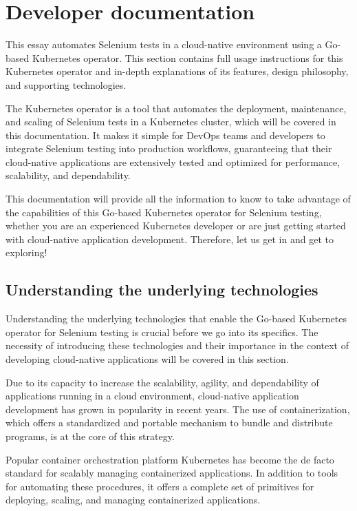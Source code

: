 \chapter{Developer documentation}
\label{ch:impl}

This essay automates Selenium tests in a cloud-native environment using a Go-based Kubernetes operator. This section contains full usage instructions for this Kubernetes operator and in-depth explanations of its features, design philosophy, and supporting technologies.

The Kubernetes operator is a tool that automates the deployment, maintenance, and scaling of Selenium tests in a Kubernetes cluster, which will be covered in this documentation. It makes it simple for DevOps teams and developers to integrate Selenium testing into production workflows, guaranteeing that their cloud-native applications are extensively tested and optimized for performance, scalability, and dependability.

This documentation will provide all the information to know to take advantage of the capabilities of this Go-based Kubernetes operator for Selenium testing, whether you are an experienced Kubernetes developer or are just getting started with cloud-native application development. Therefore, let us get in and get to exploring!

\section{Understanding the underlying technologies}

Understanding the underlying technologies that enable the Go-based Kubernetes operator for Selenium testing is crucial before we go into its specifics. The necessity of introducing these technologies and their importance in the context of developing cloud-native applications will be covered in this section.

Due to its capacity to increase the scalability, agility, and dependability of applications running in a cloud environment, cloud-native application development has grown in popularity in recent years. The use of containerization, which offers a standardized and portable mechanism to bundle and distribute programs, is at the core of this strategy.

Popular container orchestration platform Kubernetes has become the de facto standard for scalably managing containerized applications. In addition to tools for automating these procedures, it offers a complete set of primitives for deploying, scaling, and managing containerized applications.

